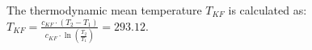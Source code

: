 The thermodynamic mean temperature \( T_{KF} \) is calculated as:  
\( T_{KF} = \frac{c_{KF} \cdot (T_2 - T_1)}{c_{KF} \cdot \ln\left(\frac{T_2}{T_1}\right)} = 293.12 \).